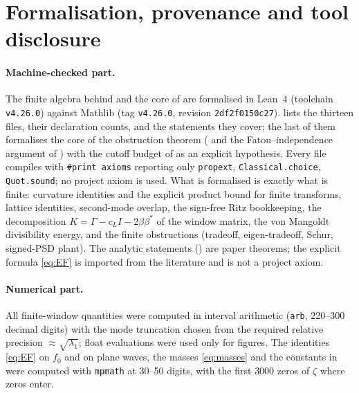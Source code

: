 \section{Formalisation, provenance and tool disclosure}\label{sec:disclosure}

\paragraph{Machine-checked part.} The finite algebra behind  and the core of  are
formalised in Lean~4 (toolchain \texttt{v4.26.0}) against Mathlib \cite{Mathlib} (tag \texttt{v4.26.0}, revision \texttt{2df2f0150c27}).
 lists the thirteen files, their declaration counts, and the statements they cover; the last of them formalises the
core of the obstruction theorem ( and the Fatou--independence argument of ) with the cutoff
budget of  as an explicit hypothesis. Every file compiles with
\texttt{\#print axioms} reporting only \texttt{propext}, \texttt{Classical.choice}, \texttt{Quot.sound}; no project axiom is used.
What is formalised is exactly what is finite: curvature identities and the explicit product bound for finite transforms, lattice
identities, second-mode overlap, the sign-free Ritz bookkeeping, the decomposition $K=\Gamma-c_LI-2\beta\beta^*$ of the window
matrix, the von Mangoldt divisibility energy, and the finite obstructions (tradeoff, eigen-tradeoff, Schur, signed-PSD plant).
The analytic statements () are paper theorems; the explicit formula \eqref{eq:EF}
is imported from the literature and is not a project axiom.

\paragraph{Numerical part.} All finite-window quantities were computed in interval arithmetic (\texttt{arb}, 220--300 decimal digits) with the mode truncation chosen from the required relative precision $\approx\sqrt{\lambda_1}$; float
evaluations were used only for figures. The identities \eqref{eq:EF} on $f_0$ and on plane waves, the masses \eqref{eq:masses} and the
constants in  were computed with \texttt{mpmath} at 30--50 digits, with the first $3000$ zeros of $\zeta$ where
zeros enter.

